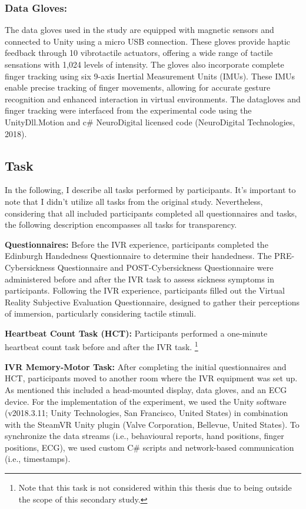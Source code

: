 \documentclass[12pt,oneside,openright]{report}
\begin{document}
\subsubsection*{Data Gloves:}
The data gloves used in the study are equipped with magnetic sensors and connected to Unity using a micro USB connection. These gloves provide haptic feedback through 10 vibrotactile actuators, offering a wide range of tactile sensations with 1,024 levels of intensity. The gloves also incorporate complete finger tracking using six 9-axis Inertial Measurement Units (IMUs). These IMUs enable precise tracking of finger movements, allowing for accurate gesture recognition and enhanced interaction in virtual environments. The datagloves and finger tracking were interfaced from the experimental code using the UnityDll.Motion and c\# NeuroDigital licensed code (NeuroDigital Technologies, 2018).


\subsection*{Task}

In the following, I describe all tasks performed by participants. It's important to note that I didn't utilize all tasks from the original study. Nevertheless, considering that all included participants completed all questionnaires and tasks, the following description encompasses all tasks for transparency.

\textbf{Questionnaires:} Before the IVR experience, participants completed the Edinburgh Handedness Questionnaire to determine their handedness. The PRE-Cybersickness Questionnaire and POST-Cybersickness Questionnaire were administered before and after the IVR task to assess sickness symptoms in participants. Following the IVR experience, participants filled out the Virtual Reality Subjective Evaluation Questionnaire, designed to gather their perceptions of immersion, particularly considering tactile stimuli. 

\textbf{Heartbeat Count Task (HCT):} Participants performed a one-minute heartbeat count task before and after the IVR task. \footnote{Note that this task is not considered within this thesis due to being outside the scope of this secondary study.}

\textbf{IVR Memory-Motor Task:} 
After completing the initial questionnaires and HCT, participants moved to another room where the IVR equipment was set up. As mentioned this included a head-mounted display, data gloves, and an ECG device. 
For the implementation of the experiment, we used the Unity software (v2018.3.11; Unity Technologies, San Francisco, United States)  in combination with the SteamVR Unity plugin (Valve Corporation, Bellevue, United States). To synchronize the data streams (i.e., behavioural reports, hand positions, finger positions, ECG), we used custom C\# scripts and network-based communication (i.e., timestamps). 
\end{document}
